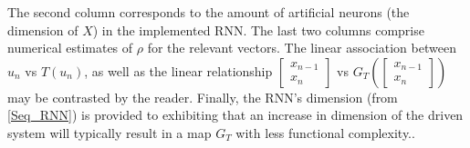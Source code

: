 \begin{center}
\begin{table}
{      The second column corresponds to the amount of artificial neurons (the dimension of $X$) in the implemented RNN.
      The last two columns comprise numerical estimates of $\rho$ for the relevant vectors. The linear association between $u_n$ vs $T(u_{n})$, as well as the linear relationship $\begin{bmatrix}
              x_{n-1}\\
              x_n
          \end{bmatrix}$ vs $G_T \left( \begin{bmatrix}
              x_{n-1}\\
              x_n
          \end{bmatrix}\right)$ may be contrasted by the reader. 
          Finally, the RNN's dimension (from \eqref{Seq_RNN}) is provided to exhibiting that an increase in dimension of the driven system will 
          typically result in a map $G_T$ with less functional complexity.}.
      \end{table}\label{tbl_attractorsPearson}
\end{center}

  